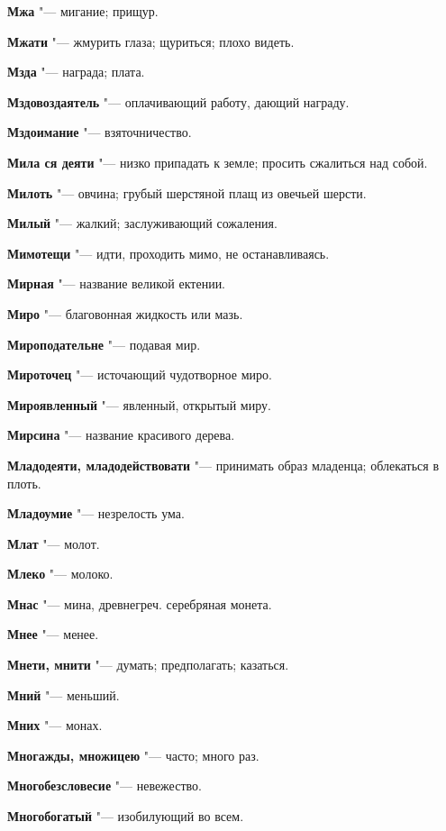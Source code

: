 \begin{mymulticols}
\noindent\textbf{Мжа} "--- мигание; прищур. 

\noindent\textbf{Мжати} "--- жмурить глаза; щуриться; плохо видеть. 

\noindent\textbf{Мзда} "--- награда; плата. 

\noindent\textbf{Мздовоздаятель} "--- оплачивающий работу, дающий награду. 

\noindent\textbf{Мздоимание} "--- взяточничество. 

\noindent\textbf{Мила ся деяти} "--- низко припадать к земле; просить сжалиться над собой. 

\noindent\textbf{Милоть} "--- овчина; грубый шерстяной плащ из овечьей шерсти. 

\noindent\textbf{Милый} "--- жалкий; заслуживающий сожаления. 

\noindent\textbf{Мимотещи} "--- идти, проходить мимо, не останавливаясь. 

\noindent\textbf{Мирная} "--- название великой ектении. 

\noindent\textbf{Миро} "--- благовонная жидкость или мазь. 

\noindent\textbf{Мироподательне} "--- подавая мир. 

\noindent\textbf{Мироточец} "--- источающий чудотворное миро. 

\noindent\textbf{Мироявленный} "--- явленный, открытый миру. 

\noindent\textbf{Мирсина} "--- название красивого дерева. 

\noindent\textbf{Младодеяти, младодействовати} "--- принимать образ младенца; облекаться в плоть. 

\noindent\textbf{Младоумие} "--- незрелость ума. 

\noindent\textbf{Млат} "--- молот. 

\noindent\textbf{Млеко} "--- молоко. 

\noindent\textbf{Мнас} "--- мина, древнегреч. серебряная монета. 

\noindent\textbf{Мнее} "--- менее. 

\noindent\textbf{Мнети, мнити} "--- думать; предполагать; казаться. 

\noindent\textbf{Мний} "--- меньший. 

\noindent\textbf{Мних} "--- монах. 

\noindent\textbf{Многажды, множицею} "--- часто; много раз. 

\noindent\textbf{Многобезсловесие} "--- невежество. 

\noindent\textbf{Многобогатый} "--- изобилующий во всем. 


\end{mymulticols}
